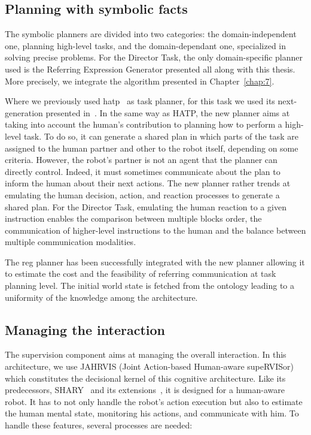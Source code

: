 \subsection{Planning with symbolic facts}

The symbolic planners are divided into two categories: the domain-independent one, planning high-level tasks, and the domain-dependant one, specialized in solving precise problems. For the Director Task, the only domain-specific planner used is the Referring Expression Generator presented all along with this thesis. More precisely, we integrate the algorithm presented in Chapter~\ref{chap:7}.

Where we previously used \acrshort{hatp}~\cite{lallement_2014_hatp} as task planner, for this task we used its next-generation presented in~\cite{buisan_2021_human}. In the same way as HATP, the new planner aims at taking into account the human's contribution to planning how to perform a high-level task. To do so, it can generate a shared plan in which parts of the task are assigned to the human partner and other to the robot itself, depending on some criteria. However, the robot's partner is not an agent that the planner can directly control. Indeed, it must sometimes communicate about the plan to inform the human about their next actions. The new planner rather trends at emulating the human decision, action, and reaction processes to generate a shared plan. For the Director Task, emulating the human reaction to a given instruction enables the comparison between multiple blocks order, the communication of higher-level instructions to the human and the balance between multiple communication modalities.

The \acrshort{reg} planner has been successfully integrated with the new planner allowing it to estimate the cost and the feasibility of referring communication at task planning level. The initial world state is fetched from the ontology leading to a uniformity of the knowledge among the architecture.

\subsection{Managing the interaction}

The supervision component aims at managing the overall interaction. In this architecture, we use JAHRVIS (Joint Action-based Human-aware supeRVISor) which constitutes the decisional kernel of this cognitive architecture. Like its predecessors, SHARY~\cite{clodic_2009_shary} and its extensions~\cite{fiore_2016_planning, devin_2016_implemented}, it is designed for a human-aware robot. It has to not only handle the robot's action execution but also to estimate the human mental state, monitoring his actions, and communicate with him. To handle these features, several processes are needed:

